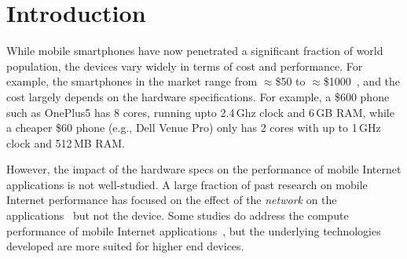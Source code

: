 

\section{Introduction} \label{intro}


While mobile smartphones have now penetrated 
a significant fraction of world population, the devices 
vary widely in terms of cost and performance. 
For example, the smartphones in the market 
range from $\approx$\$50 to $\approx$\$1000~\cite{mobilephones, contreras2017patents}, and the cost 
largely depends on the hardware specifications. 
For example, a \$600 phone such as OnePlus5 has 8 cores, running upto 2.4\,Ghz clock and 6\,GB RAM, while a cheaper \$60 phone (e.g., Dell Venue Pro) only has 2 cores with up to 1\,GHz clock and 512\,MB RAM. 

However, the impact of the hardware specs
on the performance of mobile Internet applications is not well-studied. A large fraction of past research on mobile Internet performance has focused on the effect of the {\em network} on the applications~\cite{butkiewicz2015klotski, kelton2017improving, singh2015flexiweb, Ruamviboonsuk:2017:VAM:3098822.3098851, Shafiqund, Xiaodash2m, chen2016effective} but not 
the device. Some studies do address the compute performance of mobile Internet applications~\cite{zhu2017optimizing,jones2009parallelizing,mai2012case}, but the underlying
technologies developed are more suited for higher end devices. 


